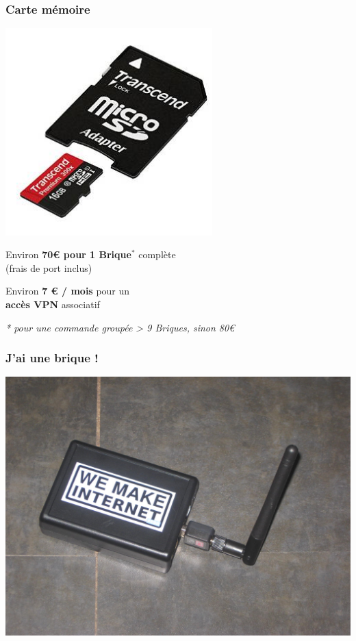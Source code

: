 \documentclass[notes=hide]{beamer}
\begin{document}
\begin{frame}[t]
\frametitle{\textcolor{titre}{Carte mémoire}}
  \begin{center}
    \includegraphics[width=0.6\textwidth]{img2/cartemem.jpg}
  \end{center}
\end{frame}

\begin{frame}[t]{}
\begin{center}
\vfill
\vfill
{\Large Environ \textbf{70\euro{} pour 1 Brique$^*$} complète \\ (frais de port inclus)}
\vspace{1cm}

{\Large Environ \textbf{7 \euro{} / mois} pour un \\ \textbf{accès VPN} associatif}
\vspace{1cm}
\vfill

{\footnotesize \emph{* pour une commande groupée > 9 Briques, sinon 80\euro}}
\vfill
\end{center}
\end{frame}

\begin{frame}[t]
\frametitle{\textcolor{titre}{J'ai une brique !}}
\begin{center}
  \vfill
    \includegraphics[width=.75\textwidth]{img2/04-photo-boitier.jpg}
  \vfill
\end{center}
\end{frame}
\end{document}
